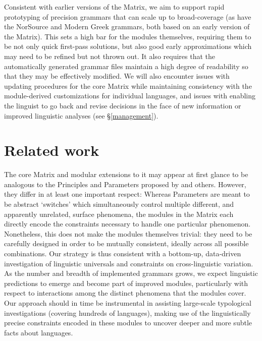 Consistent with earlier versions of the Matrix, we aim to support 
rapid prototyping of precision grammars that can scale up to
broad-coverage (as have the NorSource \cite{Hel:Hau:03} and
Modern Greek \cite{Kor:Neu:2003} grammars, both based on an early
version of the Matrix). This sets a high bar for the modules
themselves, requiring them to be not only quick first-pass solutions,
but also good early approximations which may need to be refined but not
thrown out.  It also requires that the automatically generated grammar
files maintain a high degree of readability so that they may be
effectively modified.  We will also encounter issues with updating
procedures for the core Matrix while maintaining consistency with the
module-derived customizations for individual languages, and issues
with enabling the linguist to go back and revise decisions in the face
of new information or improved linguistic analyses (see \S\ref{management}).

\section{Related work}

The core Matrix and modular extensions to it may appear at first
glance to be analogous to the Principles and Parameters proposed by
 and others.  However, they differ in at least one
important respect: Whereas Parameters are meant to be abstract
`switches' which simultaneously control multiple different, and
apparently unrelated, surface phenomena, the modules in the Matrix
each directly encode the constraints necessary to handle one
particular phenomenon.  Nonetheless, this does not make the modules
themselves trivial: they need to be carefully designed in order to be
mutually consistent, ideally across all possible combinations.  Our
strategy is thus consistent with a bottom-up, data-driven
investigation of linguistic universals and constraints on
cross-linguistic variation.  As the number and breadth of implemented
grammars grows, we expect linguistic predictions to emerge and become
part of improved modules, particularly with respect to interactions
among the distinct phenomena that the modules cover.  Our approach
should in time be instrumental in assisting large-scale typological
investigations (covering hundreds of languages), making use of the
linguistically precise constraints encoded in these modules to uncover
deeper and more subtle facts about languages.

